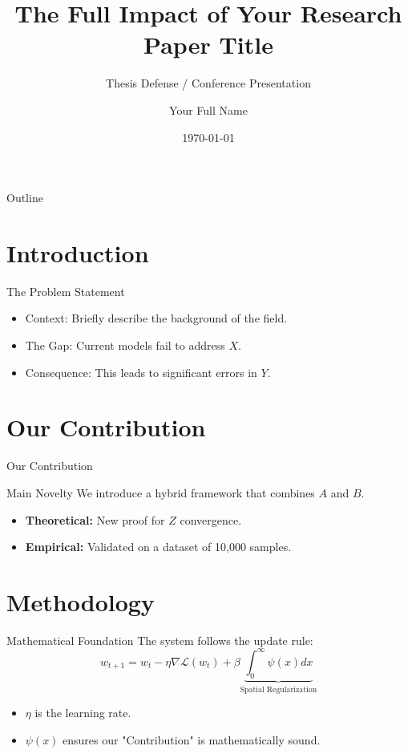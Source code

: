 \documentclass[10pt, aspectratio=169]{beamer} %
\title[Paper Short Title]{The Full Impact of Your Research Paper Title}
\subtitle{Thesis Defense / Conference Presentation}
\author[Last Name]{Your Full Name}
\institute[Univ.]{Department of Engineering \\ Your University}
\date{\today}
\begin{document}
\begin{frame}
    \titlepage
\end{frame}

\begin{frame}{Outline}
    \tableofcontents
\end{frame}

\section{Introduction}

\begin{frame}{The Problem Statement}
    \begin{itemize}
        \item Context: Briefly describe the background of the field.
        \item The Gap: Current models fail to address $X$. \pause
        \item \alert{Consequence:} This leads to significant errors in $Y$.
    \end{itemize}
\end{frame}

\section{Our Contribution}

\begin{frame}{Our Contribution}
    \begin{block}{Main Novelty}
        We introduce a hybrid framework that combines $A$ and $B$.
    \end{block}
    \begin{itemize}
        \item \textbf{Theoretical:} New proof for $Z$ convergence.
        \item \textbf{Empirical:} Validated on a dataset of 10,000 samples.
    \end{itemize}
\end{frame}

\section{Methodology}

\begin{frame}{Mathematical Foundation}
    The system follows the update rule:
    \begin{equation}
        w_{t+1} = w_t - \eta \nabla \mathcal{L}(w_t) + \beta \underbrace{\int_{0}^{\infty} \psi(x) dx}_{\text{Spatial Regularization}}
    \end{equation}
    \pause
    \begin{itemize}
        \item $\eta$ is the learning rate.
        \item $\psi(x)$ ensures our "Contribution" is mathematically sound.
    \end{itemize}
\end{frame}
\end{document}
